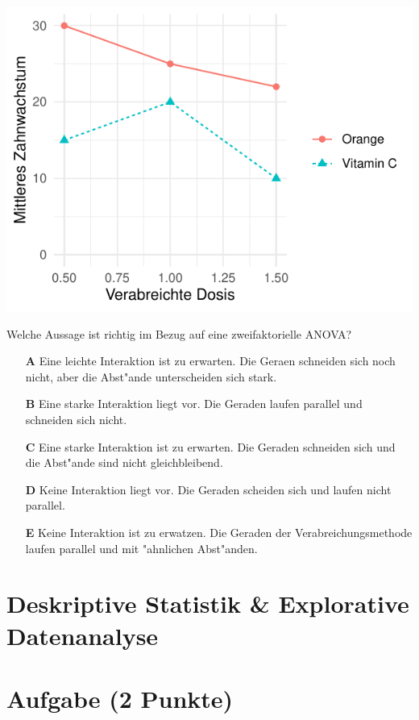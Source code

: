 \documentclass[a4paper, 9pt]{scrartcl}\usepackage[]{graphicx}\usepackage[]{xcolor}
\makeatletter
\def\maxwidth{ %
  \ifdim\Gin@nat@width>\linewidth
    \linewidth
  \else
    \Gin@nat@width
  \fi
}
\makeatother
\begin{document}
{\centering \includegraphics[width=\maxwidth]{img/mc-anova-02-a-1} 

}




Welche Aussage ist richtig im Bezug auf eine zweifaktorielle ANOVA?



\begin{enumerate}
\item [\textbf{A} \msquare] Eine leichte Interaktion ist zu erwarten. Die Geraen schneiden sich noch nicht, aber die Abst{"a}nde unterscheiden sich stark.
\item [\textbf{B} \msquare] Eine starke Interaktion liegt vor. Die Geraden laufen parallel und schneiden sich nicht.
\item [\textbf{C} \msquare] Eine starke Interaktion ist zu erwarten. Die Geraden schneiden sich und die Abst{"a}nde sind nicht gleichbleibend.
\item [\textbf{D} \msquare] Keine Interaktion liegt vor. Die Geraden scheiden sich und laufen nicht parallel.
\item [\textbf{E} \msquare] Keine Interaktion ist zu erwatzen. Die Geraden der Verabreichungsmethode laufen parallel und mit {"a}hnlichen Abst{"a}nden.
\end{enumerate} 
\section*{Deskriptive Statistik \& Explorative Datenanalyse}

\section{Aufgabe \hfill (2 Punkte)}
\end{document}
